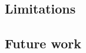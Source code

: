 \documentclass[../main.tex]{subfiles}
\begin{document}
\subsection*{Limitations}
\subsection*{Future work}
\end{document}
